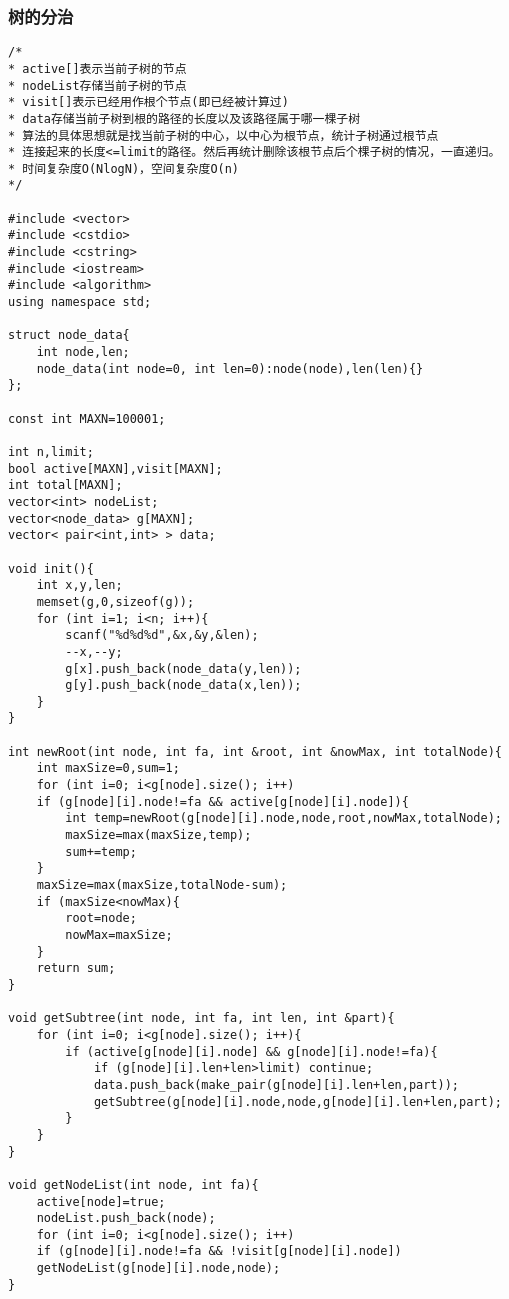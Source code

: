 \subsubsection{树的分治}
\begin{verbatim}
/*
* active[]表示当前子树的节点
* nodeList存储当前子树的节点
* visit[]表示已经用作根个节点(即已经被计算过)
* data存储当前子树到根的路径的长度以及该路径属于哪一棵子树
* 算法的具体思想就是找当前子树的中心，以中心为根节点，统计子树通过根节点
* 连接起来的长度<=limit的路径。然后再统计删除该根节点后个棵子树的情况，一直递归。
* 时间复杂度O(NlogN)，空间复杂度O(n)
*/

#include <vector>
#include <cstdio>
#include <cstring>
#include <iostream>
#include <algorithm>
using namespace std;

struct node_data{
    int node,len;
    node_data(int node=0, int len=0):node(node),len(len){}
};

const int MAXN=100001;

int n,limit;
bool active[MAXN],visit[MAXN];
int total[MAXN];
vector<int> nodeList;
vector<node_data> g[MAXN];
vector< pair<int,int> > data;

void init(){
    int x,y,len;
    memset(g,0,sizeof(g));
    for (int i=1; i<n; i++){
        scanf("%d%d%d",&x,&y,&len);
        --x,--y;
        g[x].push_back(node_data(y,len));
        g[y].push_back(node_data(x,len));
    }
}

int newRoot(int node, int fa, int &root, int &nowMax, int totalNode){
    int maxSize=0,sum=1;
    for (int i=0; i<g[node].size(); i++)
    if (g[node][i].node!=fa && active[g[node][i].node]){
        int temp=newRoot(g[node][i].node,node,root,nowMax,totalNode);
        maxSize=max(maxSize,temp);
        sum+=temp;
    }
    maxSize=max(maxSize,totalNode-sum);
    if (maxSize<nowMax){
        root=node;
        nowMax=maxSize;
    }
    return sum;
}

void getSubtree(int node, int fa, int len, int &part){
    for (int i=0; i<g[node].size(); i++){
        if (active[g[node][i].node] && g[node][i].node!=fa){
            if (g[node][i].len+len>limit) continue;
            data.push_back(make_pair(g[node][i].len+len,part));
            getSubtree(g[node][i].node,node,g[node][i].len+len,part);
        }
    }
}

void getNodeList(int node, int fa){
    active[node]=true;
    nodeList.push_back(node);
    for (int i=0; i<g[node].size(); i++)
    if (g[node][i].node!=fa && !visit[g[node][i].node])
    getNodeList(g[node][i].node,node);
}


\end{verbatim}
